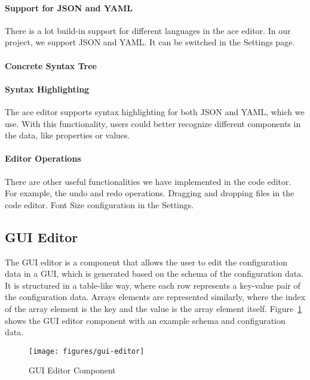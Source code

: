 \paragraph{Support for JSON and YAML}
There is a lot build-in support for different languages in the ace editor.
In our project, we support JSON and YAML. It can be switched in the Settings page.

\paragraph{Concrete Syntax Tree}

\paragraph{Syntax Highlighting}
The ace editor supports syntax highlighting for both JSON and YAML, which we use.
With this functionality, users could better recognize different components in the data, like properties or values.

\paragraph{Editor Operations}
There are other useful functionalities we have implemented in the code editor.
For example, the undo and redo operations.
Dragging and dropping files in the code editor.
Font Size configuration in the Settings.


\subsection{GUI Editor}\label{subsec:gui-editor}

The GUI editor is a component that allows the user to edit the configuration data in a GUI, which is generated based on the schema of the configuration data.
It is structured in a table-like way, where each row represents a key-value pair of the configuration data.
Arrays elements are represented similarly, where the index of the array element is the key and the value is the array element itself.
Figure~\ref{fig:gui-editor} shows the GUI editor component with an example schema and configuration data.

\begin{figure}[!t]
    \centering
    \texttt{[image: figures/gui-editor]} %
    \caption{GUI Editor Component}
    \label{fig:gui-editor}
\end{figure}

